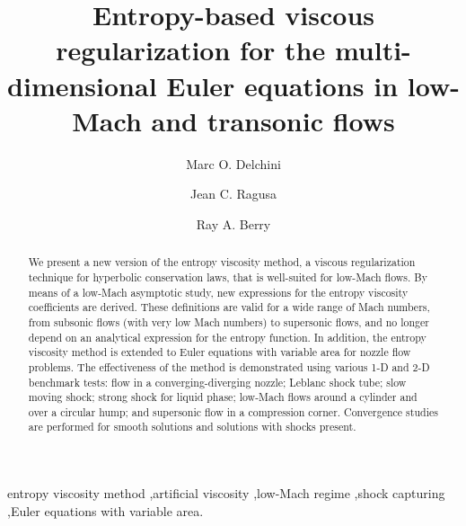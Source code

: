 \documentclass[review,10pt]{elsarticle}
\begin{document}
\begin{frontmatter}
\title{Entropy-based viscous regularization for the multi-dimensional Euler equations in low-Mach and transonic flows}
\author{Marc O. Delchini}

\author{Jean C. Ragusa}

\author{Ray A. Berry}

\address[label1]{Department of Nuclear Engineering, Texas A\&M University, College Station, TX 77843, USA }

\address[label2]{Idaho National Laboratory, Idaho Falls, ID 83415, USA }

\begin{abstract}
We present a new version of the entropy viscosity method, a viscous regularization technique for hyperbolic 
conservation laws, that is well-suited for low-Mach flows. 
By means of a low-Mach asymptotic study, new expressions for the entropy viscosity coefficients are derived.
These definitions are valid for a wide range of Mach numbers, from subsonic flows (with very low Mach  numbers) to 
supersonic flows, and no longer depend on an analytical expression for the entropy function.
In addition, the entropy viscosity method is extended to Euler equations with variable area for nozzle flow problems.
%
The effectiveness of the method is demonstrated using various 1-D and 2-D benchmark tests: flow in a converging-diverging 
nozzle; Leblanc shock tube; slow moving shock; strong shock for liquid phase; low-Mach flows around a 
cylinder and over a circular hump; and supersonic flow in a compression corner. 
Convergence studies are performed for smooth solutions and solutions with shocks present. 
\end{abstract}
\begin{keyword}
  entropy viscosity method \sep artificial  viscosity \sep low-Mach regime \sep shock capturing \sep Euler equations with variable area.
\end{keyword}
\end{frontmatter}
\linenumbers
\end{document}
